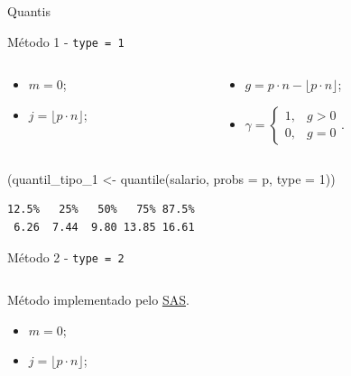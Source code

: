 \documentclass[
  10pt,
  ignorenonframetext,
]{beamer}
\newenvironment{Shaded}{\begin{snugshade}}{\end{snugshade}}
\newcommand{\AttributeTok}[1]{\textcolor[rgb]{0.40,0.45,0.13}{#1}}
\newcommand{\DecValTok}[1]{\textcolor[rgb]{0.68,0.00,0.00}{#1}}
\newcommand{\FunctionTok}[1]{\textcolor[rgb]{0.28,0.35,0.67}{#1}}
\newcommand{\NormalTok}[1]{\textcolor[rgb]{0.00,0.23,0.31}{#1}}
\newcommand{\OtherTok}[1]{\textcolor[rgb]{0.00,0.23,0.31}{#1}}
\providecommand{\tightlist}{%
  \setlength{\itemsep}{0pt}\setlength{\parskip}{0pt}}\usepackage{longtable,booktabs,array}
\begin{document}
\begin{frame}[fragile]{Quantis}
\protect\hypertarget{quantis-2}{}
\begin{block}{Método 1 - \texttt{type\ =\ 1}}
\protect\hypertarget{muxe9todo-1---type-1}{}
\begin{columns}[T]
\begin{column}{0.5\textwidth}
\begin{itemize}
\tightlist
\item
  \(m=0\);
\item
  \(j=\lfloor p\cdot n \rfloor\);
\end{itemize}
\end{column}

\begin{column}{0.5\textwidth}
\begin{itemize}
\tightlist
\item
  \(g = p\cdot n - \lfloor p\cdot n \rfloor\);
\item
  \(\gamma = \begin{cases} 1, & g > 0\\ 0,& g = 0 \end{cases}.\)
\end{itemize}
\end{column}
\end{columns}

\begin{Shaded}
\begin{Highlighting}[]
\NormalTok{(quantil\_tipo\_1 }\OtherTok{\textless{}{-}} \FunctionTok{quantile}\NormalTok{(salario, }\AttributeTok{probs =}\NormalTok{ p, }\AttributeTok{type =} \DecValTok{1}\NormalTok{))}
\end{Highlighting}
\end{Shaded}

\begin{verbatim}
12.5%   25%   50%   75% 87.5% 
 6.26  7.44  9.80 13.85 16.61 
\end{verbatim}
\end{block}

\begin{block}{Método 2 - \texttt{type\ =\ 2}}
\protect\hypertarget{muxe9todo-2---type-2}{}
\begin{columns}[T]
\begin{column}{0.5\textwidth}
Método implementado pelo
\href{https://www.sas.com/pt_br/home.html}{SAS}.

\begin{itemize}
\tightlist
\item
  \(m=0\);
\item
  \(j=\lfloor p\cdot n \rfloor\);
\end{itemize}
\end{column}


\end{columns}
\end{block}
\end{frame}
\end{document}
